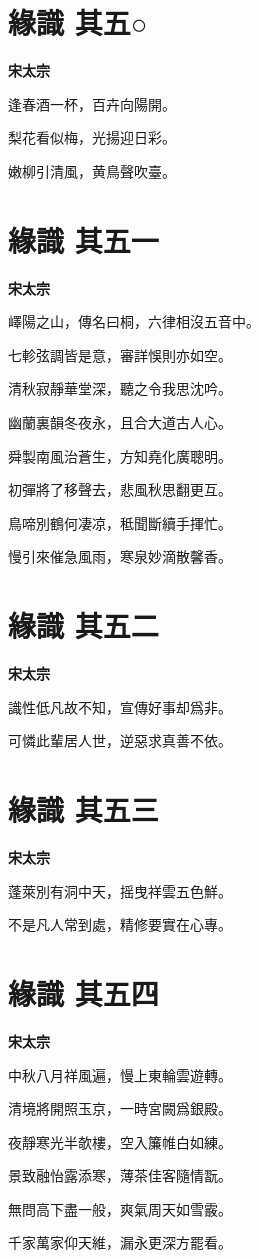 \documentclass[12pt,a4paper]{ctexbook}
\begin{document}
\section{緣識  其五○}
\textbf{宋太宗}\par\vspace{0.5em}
逢春酒一杯，百卉向陽開。\par
梨花看似梅，光揚迎日彩。\par
嫩柳引清風，黄鳥聲吹臺。\par

\section{緣識  其五一}
\textbf{宋太宗}\par\vspace{0.5em}
嶧陽之山，傳名曰桐，六律相沒五音中。\par
七軫弦調皆是意，審詳悞則亦如空。\par
清秋寂靜華堂深，聽之令我思沈吟。\par
幽蘭裏韻冬夜永，且合大道古人心。\par
舜製南風治蒼生，方知堯化廣聰明。\par
初彈將了移聲去，悲風秋思翻更互。\par
鳥啼別鶴何凄凉，秪聞斷續手揮忙。\par
慢引來催急風雨，寒泉妙滴散馨香。\par

\section{緣識  其五二}
\textbf{宋太宗}\par\vspace{0.5em}
識性低凡故不知，宣傳好事却爲非。\par
可憐此輩居人世，逆惡求真善不依。\par

\section{緣識  其五三}
\textbf{宋太宗}\par\vspace{0.5em}
蓬萊別有洞中天，摇曳祥雲五色鮮。\par
不是凡人常到處，精修要實在心專。\par

\section{緣識  其五四}
\textbf{宋太宗}\par\vspace{0.5em}
中秋八月祥風遍，慢上東輪雲遊轉。\par
清境將開照玉京，一時宮闕爲銀殿。\par
夜靜寒光半欹樓，空入簾帷白如練。\par
景致融怡露添寒，薄茶佳客隨情翫。\par
無問高下盡一般，爽氣周天如雪霰。\par
千家萬家仰天維，漏永更深方罷看。\par
\end{document}
